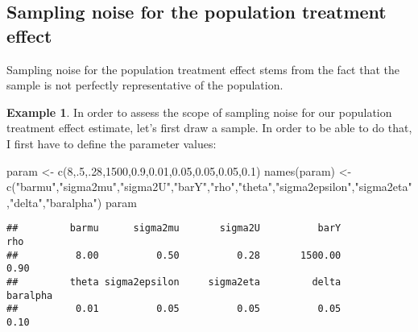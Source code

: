 \documentclass[
]{book}
\newenvironment{Shaded}{\begin{snugshade}}{\end{snugshade}}
\newcommand{\DecValTok}[1]{\textcolor[rgb]{0.00,0.00,0.81}{#1}}
\newcommand{\FloatTok}[1]{\textcolor[rgb]{0.00,0.00,0.81}{#1}}
\newcommand{\FunctionTok}[1]{\textcolor[rgb]{0.00,0.00,0.00}{#1}}
\newcommand{\NormalTok}[1]{#1}
\newcommand{\OtherTok}[1]{\textcolor[rgb]{0.56,0.35,0.01}{#1}}
\newcommand{\StringTok}[1]{\textcolor[rgb]{0.31,0.60,0.02}{#1}}
\theoremstyle{definition}
\theoremstyle{definition}
\newtheorem{example}{Example}[chapter]
\theoremstyle{definition}
\theoremstyle{definition}
\theoremstyle{remark}
\begin{document}
\hypertarget{sec:illusnoisepop}{%
\subsection{Sampling noise for the population treatment effect}\label{sec:illusnoisepop}}

Sampling noise for the population treatment effect stems from the fact that the sample is not perfectly representative of the population.

\begin{example}
\protect\hypertarget{exm:unnamed-chunk-33}{}{\label{exm:unnamed-chunk-33} }In order to assess the scope of sampling noise for our population treatment effect estimate, let's first draw a sample.
In order to be able to do that, I first have to define the parameter values:
\end{example}

\begin{Shaded}
\begin{Highlighting}[]
\NormalTok{param }\OtherTok{\textless{}{-}} \FunctionTok{c}\NormalTok{(}\DecValTok{8}\NormalTok{,.}\DecValTok{5}\NormalTok{,.}\DecValTok{28}\NormalTok{,}\DecValTok{1500}\NormalTok{,}\FloatTok{0.9}\NormalTok{,}\FloatTok{0.01}\NormalTok{,}\FloatTok{0.05}\NormalTok{,}\FloatTok{0.05}\NormalTok{,}\FloatTok{0.05}\NormalTok{,}\FloatTok{0.1}\NormalTok{)}
\FunctionTok{names}\NormalTok{(param) }\OtherTok{\textless{}{-}} \FunctionTok{c}\NormalTok{(}\StringTok{"barmu"}\NormalTok{,}\StringTok{"sigma2mu"}\NormalTok{,}\StringTok{"sigma2U"}\NormalTok{,}\StringTok{"barY"}\NormalTok{,}\StringTok{"rho"}\NormalTok{,}\StringTok{"theta"}\NormalTok{,}\StringTok{"sigma2epsilon"}\NormalTok{,}\StringTok{"sigma2eta"}\NormalTok{,}\StringTok{"delta"}\NormalTok{,}\StringTok{"baralpha"}\NormalTok{)}
\NormalTok{param}
\end{Highlighting}
\end{Shaded}

\begin{verbatim}
##         barmu      sigma2mu       sigma2U          barY           rho 
##          8.00          0.50          0.28       1500.00          0.90 
##         theta sigma2epsilon     sigma2eta         delta      baralpha 
##          0.01          0.05          0.05          0.05          0.10
\end{verbatim}
\end{document}
